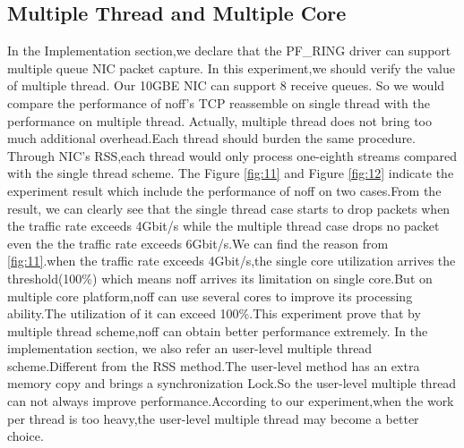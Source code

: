 \documentclass[conference]{IEEEtran}
\begin{document}
\subsection{Multiple Thread and Multiple Core}
In the Implementation section,we declare that the PF\_RING driver can support multiple queue NIC packet capture. In this experiment,we should verify the value of multiple thread.
\newline\indent Our 10GBE NIC can support 8 receive queues. So we would compare the performance of noff's TCP reassemble on single thread with the performance on multiple thread. Actually, multiple thread does not bring too much additional overhead.Each thread should burden the same procedure. Through NIC's RSS,each thread would only process one-eighth streams compared with the single thread scheme.
\newline\indent The Figure \ref{fig:11} and Figure \ref{fig:12} indicate the experiment result which include the performance of noff on two cases.From the result, we can clearly see that the single thread case starts to drop packets when the traffic rate exceeds 4Gbit/s while the multiple thread case drops no packet even the the traffic rate exceeds 6Gbit/s.We can find the reason from \ref{fig:11}.when the traffic rate exceeds 4Gbit/s,the single core utilization arrives the threshold(100\%) which means noff arrives its limitation on single core.But on multiple core platform,noff can use several cores to improve its processing ability.The utilization of it can exceed 100\%.This experiment prove that by multiple thread scheme,noff can obtain better performance extremely.
\newline\indent In the implementation section, we also refer an user-level multiple thread scheme.Different from the RSS method.The user-level method has an extra memory copy and brings a synchronization Lock.So the user-level multiple thread can not always improve performance.According to our experiment,when the work per thread is too heavy,the user-level multiple thread may become a better choice. 
\end{document}
